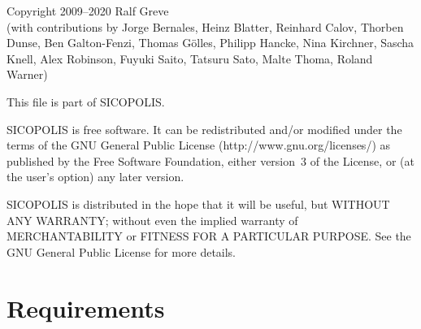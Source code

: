 \documentclass[12pt,a4paper]{article}
\begin{document}
\begin{center}\begin{minipage}{0.85\textwidth}

\begin{small}

\noindent{}Copyright 2009--2020 Ralf Greve\\
(with contributions by Jorge Bernales, Heinz Blatter, Reinhard Calov, Thorben Dunse, Ben Galton-Fenzi, Thomas G\"olles, Philipp Hancke, Nina Kirchner, Sascha Knell, Alex Robinson, Fuyuki Saito, Tatsuru Sato, Malte Thoma, Roland Warner)

\vspace*{1.5ex}

\noindent{}This file is part of SICOPOLIS.

\vspace*{1.5ex}

\noindent{}SICOPOLIS is free software. It can be redistributed and/or modified under the terms of the GNU General Public License (http://www.gnu.org/licenses/) as published by the Free Software Foundation, either version~3 of the License, or (at the user's option) any later version.

\vspace*{1.5ex}

\noindent{}SICOPOLIS is distributed in the hope that it will be useful, but WITHOUT ANY WARRANTY; without even the implied warranty of MERCHANTABILITY or FITNESS FOR A PARTICULAR PURPOSE.  See the GNU General Public License for more details.

\end{small}

\end{minipage}\end{center}

\vfill

\rule{0mm}{0mm}

\clearpage

\section{Requirements}
\end{document}
